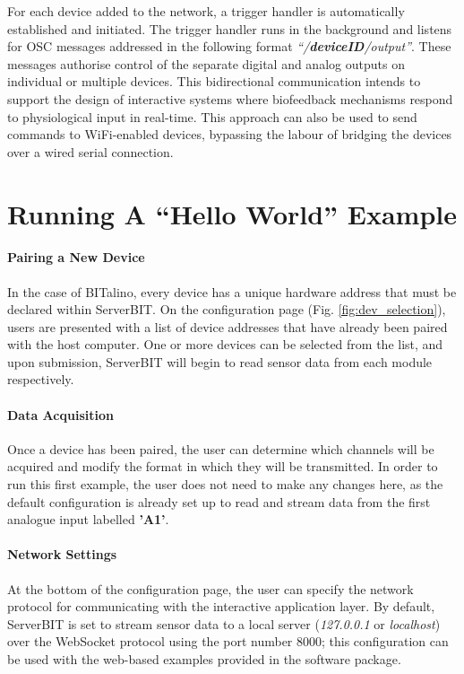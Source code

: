 For each device added to the network, a trigger handler is automatically established and initiated. The trigger handler runs in the background and listens for OSC messages addressed in the following format \textit{``/\textbf{deviceID}/output''}. These messages authorise control of the separate digital and analog outputs on individual or multiple devices. This bidirectional communication intends to support the design of interactive systems where biofeedback mechanisms respond to physiological input in real-time. This approach can also be used to send commands to WiFi-enabled devices, bypassing the labour of bridging the devices over a wired serial connection.

\section{Running A ``Hello World'' Example}

\paragraph{Pairing a New Device} \label{Pairing}
In the case of BITalino, every device has a unique hardware address that must be declared within ServerBIT. On the configuration page (Fig. \ref{fig:dev_selection}), users are presented with a list of device addresses that have already been paired with the host computer. One or more devices can be selected from the list, and upon submission, ServerBIT will begin to read sensor data from each module respectively.

\paragraph{Data Acquisition}
Once a device has been paired, the user can determine which channels will be acquired and modify the format in which they will be transmitted. In order to run this first example, the user does not need to make any changes here, as the default configuration is already set up to read and stream data from the first analogue input labelled \textbf{'A1'}.

\paragraph{Network Settings}
At the bottom of the configuration page, the user can specify the network protocol for communicating with the interactive application layer. By default, ServerBIT is set to stream sensor data to a local server (\textit{127.0.0.1} or \textit{localhost}) over the WebSocket protocol using the port number 8000; this configuration can be used with the web-based examples provided in the software package.

